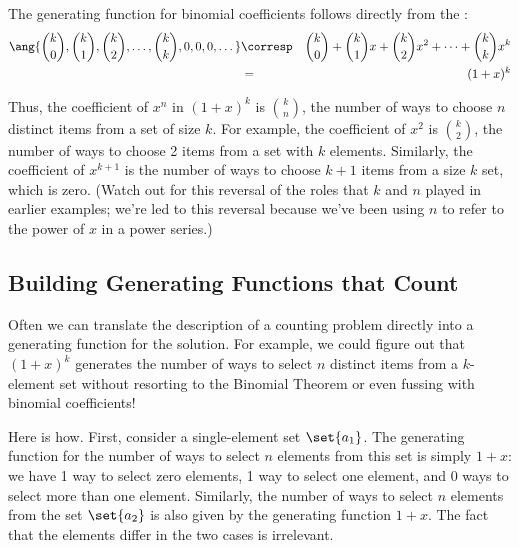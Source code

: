 The generating function for binomial coefficients follows directly
from the :
%
\begin{eqnarray*}
\ang{ \binom{k}{0}, \binom{k}{1}, \binom{k}{2}, \dots, \binom{k}{k},
        0, 0, 0, \dots }
    & \corresp & \binom{k}{0} + \binom{k}{1} x + \binom{k}{2} x^2 + \cdots + \binom{k}{k} x^k \\
    & = & (1 + x)^k
\end{eqnarray*}

Thus, the coefficient of $x^n$ in $(1 + x)^k$ is $\binom{k}{n}$, the
number of ways to choose $n$ distinct items from a set of size $k$.  For
example, the coefficient of $x^2$ is $\binom{k}{2}$, the number of ways to
choose 2 items from a set with $k$ elements.  Similarly, the coefficient
of $x^{k+1}$ is the number of ways to choose $k+1$ items from a size $k$
set, which is zero.  (Watch out for this reversal of the roles that $k$
and $n$ played in earlier examples; we're led to this reversal because
we've been using $n$ to refer to the power of $x$ in a power series.)

\subsection{Building Generating Functions that Count}

Often we can translate the description of a counting problem directly
into a generating function for the solution.  For example, we could
figure out that $(1 + x)^k$ generates the number of ways to select $n$
distinct items from a $k$-element set without resorting to the
Binomial Theorem or even fussing with binomial coefficients!

Here is how.  First, consider a single-element set $\set{a_1}$.  The
generating function for the number of ways to select $n$ elements from
this set is simply $1 + x$: we have 1 way to select zero elements, 1
way to select one element, and 0 ways to select more than one element.
Similarly, the number of ways to select $n$ elements from the set
$\set{a_2}$ is also given by the generating function $1 + x$.  The
fact that the elements differ in the two cases is irrelevant.


